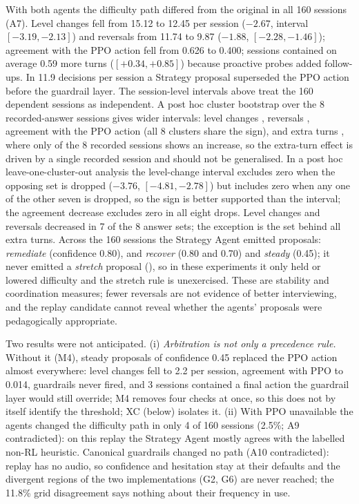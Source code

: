 With both agents the difficulty path differed from the original in all 160 sessions (A7). Level changes fell from 15.12 to 12.45 per session ($-2.67$, interval $[-3.19,-2.13]$) and reversals from 11.74 to 9.87 ($-1.88$, $[-2.28,-1.46]$); agreement with the PPO action fell from 0.626 to 0.400; sessions contained on average 0.59 more turns ($[+0.34,+0.85]$) because proactive probes added follow-ups. In 11.9 decisions per session a Strategy proposal superseded the PPO action before the guardrail layer. The session-level intervals above treat the 160 dependent sessions as independent. A post hoc cluster bootstrap over the 8 recorded-answer sessions gives wider intervals: level changes \phchgmean{} \phchgci{}, reversals \phrevmean{} \phrevci{}, agreement with the PPO action \phagrmean{} \phagrci{} (all 8 clusters share the sign), and extra turns \phfumean{} \phfuci{}, where only \phfusame{} of the 8 recorded sessions shows an increase, so the extra-turn effect is driven by a single recorded session and should not be generalised. In a post hoc leave-one-cluster-out analysis the level-change interval excludes zero when the opposing set is dropped ($-3.76$, $[-4.81,-2.78]$) but includes zero when any one of the other seven is dropped, so the sign is better supported than the interval; the agreement decrease excludes zero in all eight drops. Level changes and reversals decreased in 7 of the 8 answer sets; the exception is the set behind all extra turns. Across the 160 sessions the Strategy Agent emitted \scTotal{} proposals: \scRemEight{} \emph{remediate} (confidence 0.80), \scRecEight{} and \scRecSeven{} \emph{recover} (0.80 and 0.70) and \scSteady{} \emph{steady} (0.45); it never emitted a \emph{stretch} proposal (\scStretch{}), so in these experiments it only held or lowered difficulty and the stretch rule is unexercised. These are stability and coordination measures; fewer reversals are not evidence of better interviewing, and the replay candidate cannot reveal whether the agents' proposals were pedagogically appropriate.

Two results were not anticipated. (i) \emph{Arbitration is not only a precedence rule.} Without it (M4), steady proposals of confidence 0.45 replaced the PPO action almost everywhere: level changes fell to 2.2 per session, agreement with PPO to 0.014, guardrails never fired, and 3 sessions contained a final action the guardrail layer would still override; M4 removes four checks at once, so this does not by itself identify the threshold; XC (below) isolates it. (ii) With PPO unavailable the agents changed the difficulty path in only 4 of 160 sessions (2.5\%; A9 contradicted): on this replay the Strategy Agent mostly agrees with the labelled non-RL heuristic. Canonical guardrails changed no path (A10 contradicted): replay has no audio, so confidence and hesitation stay at their defaults and the divergent regions of the two implementations (G2, G6) are never reached; the 11.8\% grid disagreement says nothing about their frequency in use.

